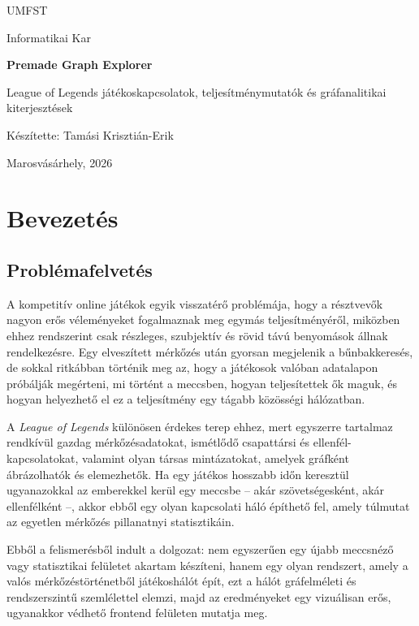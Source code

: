 \documentclass[a4paper,12pt]{report}
\begin{document}
\begin{titlepage}
    \centering
    {\LARGE UMFST \par}
    \vspace{1.2cm}
    {\Large Informatikai Kar \par}
    \vspace{3.3cm}
    {\huge\bfseries Premade Graph Explorer\par}
    \vspace{0.5cm}
    {\Large League of Legends játékoskapcsolatok, teljesítménymutatók és gráfanalitikai kiterjesztések\par}
    \vfill
    {\Large Készítette: Tamási Krisztián-Erik\par}
    \vspace{2.3cm}
    {\large Marosvásárhely, 2026\par}
\end{titlepage}

\tableofcontents
\clearpage

\chapter{Bevezetés}

\section{Problémafelvetés}

A kompetitív online játékok egyik visszatérő problémája, hogy a résztvevők nagyon erős véleményeket fogalmaznak meg egymás teljesítményéről, miközben ehhez rendszerint csak részleges, szubjektív és rövid távú benyomások állnak rendelkezésre. Egy elveszített mérkőzés után gyorsan megjelenik a bűnbakkeresés, de sokkal ritkábban történik meg az, hogy a játékosok valóban adatalapon próbálják megérteni, mi történt a meccsben, hogyan teljesítettek ők maguk, és hogyan helyezhető el ez a teljesítmény egy tágabb közösségi hálózatban.

A \emph{League of Legends} különösen érdekes terep ehhez, mert egyszerre tartalmaz rendkívül gazdag mérkőzésadatokat, ismétlődő csapattársi és ellenfél-kapcsolatokat, valamint olyan társas mintázatokat, amelyek gráfként ábrázolhatók és elemezhetők. Ha egy játékos hosszabb időn keresztül ugyanazokkal az emberekkel kerül egy meccsbe -- akár szövetségesként, akár ellenfélként --, akkor ebből egy olyan kapcsolati háló építhető fel, amely túlmutat az egyetlen mérkőzés pillanatnyi statisztikáin.

Ebből a felismerésből indult a dolgozat: nem egyszerűen egy újabb meccsnéző vagy statisztikai felületet akartam készíteni, hanem egy olyan rendszert, amely a valós mérkőzéstörténetből játékoshálót épít, ezt a hálót gráfelméleti és rendszerszintű szemlélettel elemzi, majd az eredményeket egy vizuálisan erős, ugyanakkor védhető frontend felületen mutatja meg.
\end{document}
